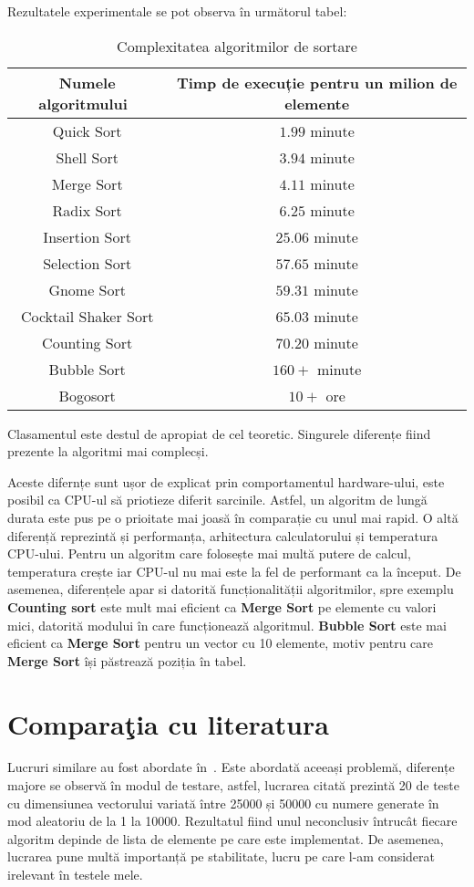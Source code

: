 \documentclass[12pt]{article}
\begin{document}
Rezultatele experimentale se pot observa în următorul tabel:
\begin{table}[ht]
\caption{Complexitatea algoritmilor de sortare}
\centering
\begin{tabular}{c c} 
\hline\hline 
Numele algoritmului\ & Timp de execuție pentru un milion de elemente \\ [0.5ex] 

\hline 
Quick Sort & $1.99$ minute\\ 
Shell Sort & $3.94$ minute\\
Merge Sort & $4.11$ minute\\
Radix Sort & $6.25$ minute \\
Insertion Sort & $25.06$ minute \\
Selection Sort & $57.65$ minute\\ 
Gnome Sort & $59.31$ minute\\
Cocktail Shaker Sort &  $65.03$ minute\\
Counting Sort&  $70.20$ minute\\
Bubble Sort &  $160+$ minute\\
Bogosort &  $10+$ ore\\[1ex]

\hline 
\end{tabular}
\label{table:nonlin} 
\end{table}

Clasamentul este destul de apropiat de cel teoretic.
Singurele diferențe fiind prezente la algoritmi mai complecși.

Aceste difernțe sunt ușor de explicat prin comportamentul hardware-ului, este posibil ca CPU-ul să priotieze diferit sarcinile. Astfel, un algoritm de lungă durata este pus pe o prioitate mai joasă în comparație cu unul mai rapid. O altă diferență reprezintă și performanța, arhitectura calculatorului și temperatura CPU-ului.  Pentru un algoritm care folosește mai multă putere de calcul, temperatura crește iar CPU-ul nu mai este la fel de performant ca la început.
De asemenea, diferențele apar si datorită funcționalității algoritmilor, spre exemplu \textbf{Counting sort} este mult mai eficient ca \textbf{Merge Sort} pe elemente cu valori mici, datorită modului în care funcționează algoritmul. \textbf{Bubble Sort} este  mai eficient ca \textbf{Merge Sort} 
pentru un vector cu 10 elemente, motiv pentru care \textbf{Merge Sort} își păstrează poziția în tabel.

\section{Comparaţia cu literatura}
\label{sec:comp}
Lucruri similare au fost abordate în~\cite{LAMFO2019}.
Este abordată aceeași problemă, diferențe majore se observă în modul de testare, astfel, lucrarea citată prezintă 20 de teste cu dimensiunea vectorului variată între 25000 și 50000 cu numere generate în mod aleatoriu de la 1 la 10000. Rezultatul fiind unul neconclusiv întrucât fiecare algoritm depinde de lista de elemente pe care este implementat. De asemenea, lucrarea pune multă importanță pe stabilitate, lucru pe care l-am considerat irelevant în testele mele.
\end{document}
